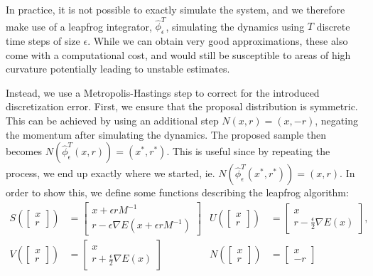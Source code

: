 In practice, it is not possible to exactly simulate the system, and we therefore make use of a leapfrog integrator, $\hat{\phi}_\epsilon^T$, simulating the dynamics using $T$ discrete time steps of size $\epsilon$. While we can obtain very good approximations, these also come with a computational cost, and would still be susceptible to areas of high curvature potentially leading to unstable estimates. 

Instead, we use a Metropolis-Hastings step to correct for the introduced discretization error. First, we ensure that the proposal distribution is symmetric. This can be achieved by using an additional step $N(x, r) = (x, -r)$, negating the momentum after simulating the dynamics. The proposed sample then becomes $ N(\hat{\phi}_\epsilon^T(x, r))= (x^\ast, r^\ast)$. This is useful since by repeating the process, we end up exactly where we started, ie. $ N(\hat{\phi}_\epsilon^T(x^\ast, r^\ast)) = (x, r)$. In order to show this, we define some functions describing the leapfrog algorithm:
\begin{align*}
    S \left(\begin{bmatrix} x \\ r \end{bmatrix}\right) 
    &= \begin{bmatrix} x + \epsilon r M^{-1} \\ r - \epsilon \nabla E(x + \epsilon r M^{-1}) \end{bmatrix} &
    U\left(\begin{bmatrix} x \\ r \end{bmatrix}\right) 
    &= \begin{bmatrix} x \\ r - \frac{\epsilon}{2} \nabla E(x) \end{bmatrix}, \\
    V\left(\begin{bmatrix} x \\ r \end{bmatrix}\right) 
    &= \begin{bmatrix} x \\ r + \frac{\epsilon}{2} \nabla E(x) \end{bmatrix} &
    N \left(\begin{bmatrix} x \\ r \end{bmatrix}\right) 
    &= \begin{bmatrix} x \\ -r
    \end{bmatrix} 
\end{align*}
